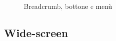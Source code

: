 \documentclass[]{article}
\begin{document}
\begin{figure}[H]
	\centering
	\caption{Breadcrumb, bottone e menù}
\end{figure}

\subsection{Wide-screen}
\end{document}
